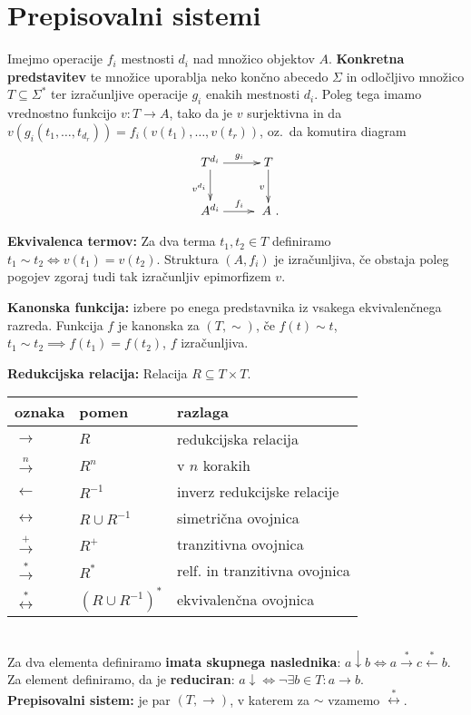 \documentclass[a4paper,oneside,10pt]{article}
\title{\Title}
\author{\Author}
\date{\today}
\theoremstyle{definition}
\newcommand{\lstar}{\overset{*}{\gets}}
\newcommand{\rstar}{\overset{*}{\to}}
\newcommand{\istar}{\overset{*}{\leftrightarrow}}
\newcommand{\red}{\downarrow}
\let\oldtextbf\textbf
\renewcommand{\textbf}[1]{\oldtextbf{\boldmath #1}}
\begin{document}
\section*{Prepisovalni sistemi} %
Imejmo operacije $f_i$ mestnosti $d_i$ nad množico objektov $A$. \textbf{Konkretna predstavitev} te množice uporablja neko končno abecedo $\Sigma$ in odločljivo množico $T \subseteq \Sigma^*$ ter izračunljive operacije $g_i$ enakih mestnosti $d_i$. Poleg tega imamo vrednostno funkcijo $v\colon T \to A$, tako da je $v$ surjektivna in
da $v(g_i(t_1, \dots, t_{d_r})) = f_i(v(t_1), \dots , v(t_r))$, oz.\ da komutira diagram
\[
\xymatrix{
  T^{d_i} \ar[r]^{g_i} \ar[d]_{v^{d_i}} & T \ar[d]_{v} \\
  A^{d_i} \ar[r]^{f_i} & \ A\ .
}\]

\textbf{Ekvivalenca termov:} Za dva terma $t_1, t_2 \in T$ definiramo
$t_1\sim t_2 \iff v(t_1) = v(t_2)$.
Struktura $(A, f_i)$ je izračunljiva, če obstaja poleg pogojev zgoraj tudi tak izračunljiv epimorfizem $v$.

\textbf{Kanonska funkcija:} izbere po enega predstavnika iz vsakega ekvivalenčnega razreda. Funkcija $f$ je kanonska za $(T, \sim)$, če
$f(t)  \sim t$, $t_1 \sim t_2 \implies f(t_1) = f(t_2)$, $f$ izračunljiva.

\textbf{Redukcijska relacija: } Relacija $R \subseteq T\times T$. \\
\begin{tabular}{lll}
     oznaka & pomen & razlaga \\ \hline
     $\to$ & $R$ & redukcijska relacija \\
     $\overset{n}{\to}$ & $R^n$ & v $n$ korakih \\
     $\gets$ & $R^{-1}$ & inverz redukcijske relacije \\
     $\leftrightarrow$ & $R \cup R^{-1}$ & simetrična ovojnica \\
     $\overset{+}{\to}$ & $R^+$ & tranzitivna ovojnica \\
     $\rstar$ & $R^*$ & relf. in tranzitivna ovojnica \\
     $\istar$ & $(R \cup R^{-1})^*$ & ekvivalenčna ovojnica \\
\end{tabular} \\
Za dva elementa definiramo \textbf{imata skupnega naslednika}: $a \red b \iff a \rstar c \lstar b$. \\
Za element definiramo, da je \textbf{reduciran}: $a \red \iff \neg \exists b \in T\colon a \to b$. \\
\textbf{Prepisovalni sistem:} je par $(T, \to)$, v katerem za $\sim$ vzamemo $\istar$.
\end{document}
